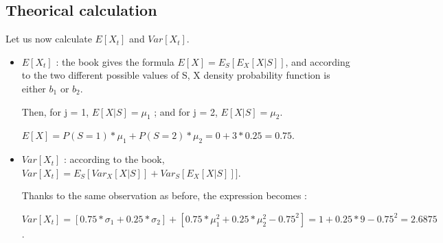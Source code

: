 \documentclass[a4paper]{report}
\begin{document}
\subsection{Theorical calculation}
Let us now calculate $E[X_{t}]$ and $Var[X_{t}]$.

\begin{itemize}
	\item 
	$E[X_{t}]$ : the book gives the formula $E[X]=E_{S}[E_{X}[X|S]]$, and according to the two different possible values of S, X density probability function is either $b_{1}$ or $b_{2}$.
	
	Then, for j = 1, $E[X|S]=\mu_{1}$ ;
	and for j = 2, $E[X|S]=\mu_{2}$.
	
	
	$E[X]=P(S=1)*\mu_{1} + P(S=2)*\mu_{2} = 0 + 3*0.25 = 0.75$.
	
\end{itemize}

\begin{itemize}
	\item $Var[X_{t}]$ : according to the book, $Var[X_{t}]=E_{S}[Var_{X}[X|S]] + Var_{S}[E_{X}[X|S]]]$.
	
	Thanks to the same observation as before, the expression becomes :
	
	$Var[X_{t}]=[0.75 * \sigma_{1} + 0.25*\sigma_{2}] + [0.75*\mu_{1}^2+0.25*\mu_{2}^2 - 0.75^2] = 1+0.25*9-0.75^2=2.6875$.
\end{itemize}
\pagebreak
\end{document}
